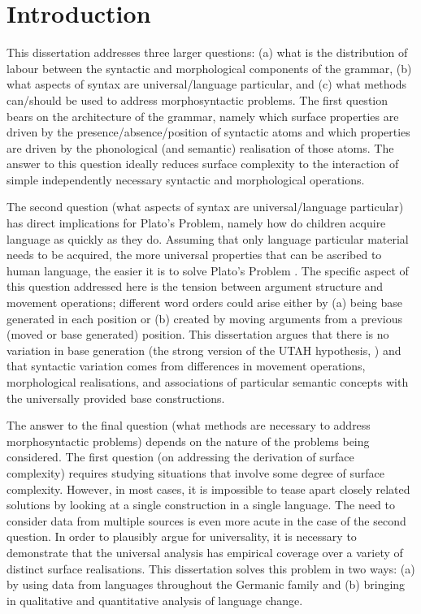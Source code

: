 \chapter{Introduction}
\label{ch:introduction}

This dissertation addresses three larger questions: (a) what is the distribution of labour between the syntactic and morphological components of the grammar, (b) what aspects of syntax are universal/language particular, and (c) what methods can/should be used to address morphosyntactic problems. The first question bears on the architecture of the grammar, namely which surface properties are driven by the presence/absence/position of syntactic atoms and which properties are driven by the phonological (and semantic) realisation of those atoms. The answer to this question ideally reduces surface complexity to the interaction of simple independently necessary syntactic and morphological operations.

The second question (what aspects of syntax are universal/language particular) has direct implications for Plato's Problem, namely how do children acquire language as quickly as they do. Assuming that only language particular material needs to be acquired, the more universal properties that can be ascribed to human language, the easier it is to solve Plato's Problem \citep{Chomsky.1993}. The specific aspect of this question addressed here is the tension between argument structure and movement operations; different word orders could arise either by (a) being base generated in each position or (b) created by moving arguments from a previous (moved or base generated) position. This dissertation argues that there is no variation in base generation (the strong version of the UTAH hypothesis, \citealt{Baker.1988}) and that syntactic variation comes from differences in movement operations, morphological realisations, and associations of particular semantic concepts with the universally provided base constructions.

The answer to the final question (what methods are necessary to address morphosyntactic problems) depends on the nature of the problems being considered. The first question (on addressing the derivation of surface complexity) requires studying situations that involve some degree of surface complexity. However, in most cases, it is impossible to tease apart closely related solutions by looking at a single construction in a single language. The need to consider data from multiple sources is even more acute in the case of the second question. In order to plausibly argue for universality, it is necessary to demonstrate that the universal analysis has empirical coverage over a variety of distinct surface realisations. This dissertation solves this problem in two ways: (a) by using data from languages throughout the Germanic family and (b) bringing in qualitative and quantitative analysis of language change.

